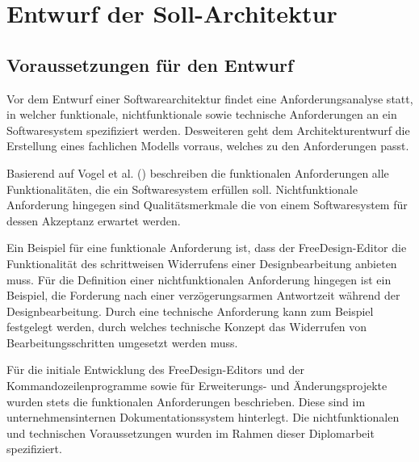 \section{Entwurf der Soll-Architektur}

\subsection{Voraussetzungen für den Entwurf}
Vor dem Entwurf einer Softwarearchitektur findet eine Anforderungsanalyse statt, in welcher funktionale, nichtfunktionale sowie technische Anforderungen an ein Softwaresystem spezifiziert werden. Desweiteren geht dem Architekturentwurf die Erstellung eines fachlichen Modells vorraus, welches zu den Anforderungen passt. \autocite[vgl.][S. 58 - 59]{Posch2007}

Basierend auf Vogel et al. (\citeyear[vgl.][S. 113 - 114]{Vogel2009}) beschreiben die funktionalen Anforderungen alle Funktionalitäten, die ein Softwaresystem erfüllen soll. Nichtfunktionale Anforderung hingegen sind Qualitätsmerkmale die von einem Softwaresystem für dessen Akzeptanz erwartet werden. 

Ein Beispiel für eine funktionale Anforderung ist, dass der FreeDesign-Editor die Funktionalität des schrittweisen Widerrufens einer Designbearbeitung anbieten muss. 
Für die Definition einer nichtfunktionalen Anforderung hingegen ist ein Beispiel, die Forderung nach einer verzögerungsarmen Antwortzeit während der Designbearbeitung.
Durch eine technische Anforderung kann zum Beispiel festgelegt werden, durch welches technische Konzept das Widerrufen von Bearbeitungsschritten umgesetzt werden muss. 

Für die initiale Entwicklung des FreeDesign-Editors und der Kommandozeilenprogramme sowie für Erweiterungs- und Änderungsprojekte wurden stets die funktionalen Anforderungen beschrieben. Diese sind im unternehmensinternen Dokumentationssystem hinterlegt. 
Die nichtfunktionalen und technischen Voraussetzungen wurden im Rahmen dieser Diplomarbeit spezifiziert. 

